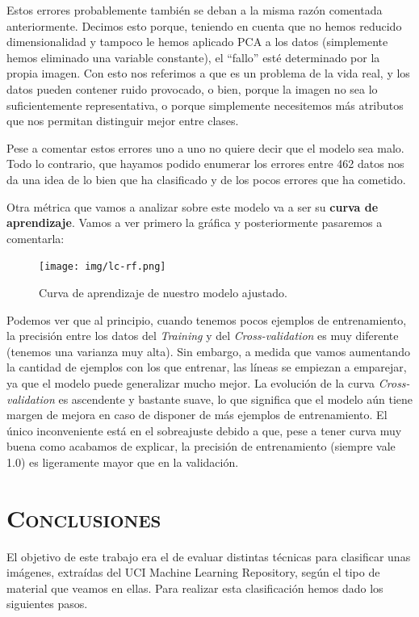 \documentclass[11pt,a4paper]{article}
\begin{document}
Estos errores probablemente también se deban a la misma razón comentada anteriormente. Decimos esto porque, teniendo en cuenta que no
hemos reducido dimensionalidad y tampoco le hemos aplicado PCA a los datos (simplemente hemos eliminado una variable constante), el ``fallo'' 
esté determinado por la propia imagen. Con esto nos referimos a que es un problema de la vida real, y los datos pueden contener ruido
provocado, o bien, porque la imagen no sea lo suficientemente representativa, o porque simplemente necesitemos más atributos que nos
permitan distinguir mejor entre clases.

Pese a comentar estos errores uno a uno no quiere decir que el modelo sea malo. Todo lo contrario, que hayamos podido enumerar los errores
entre 462 datos nos da una idea de lo bien que ha clasificado y de los pocos errores que ha cometido.

Otra métrica que vamos a analizar sobre este modelo va a ser su \textbf{curva de aprendizaje}. Vamos a ver primero la gráfica y
posteriormente pasaremos a comentarla:

\begin{figure}[H]
    \centering
    \texttt{[image: img/lc-rf.png]}
    \caption{Curva de aprendizaje de nuestro modelo ajustado.}
    \label{fig:lc-rf}
\end{figure}

Podemos ver que al principio, cuando tenemos pocos ejemplos de entrenamiento, la precisión entre los datos del \textit{Training} y del
\textit{Cross-validation} es muy diferente (tenemos una varianza muy alta). Sin embargo, a medida que vamos aumentando la cantidad de
ejemplos con los que entrenar, las líneas se empiezan a emparejar, ya que el modelo puede generalizar mucho mejor. La evolución de la curva
\textit{Cross-validation} es ascendente y bastante suave, lo que significa que el modelo aún tiene margen de mejora en caso de disponer de
más ejemplos de entrenamiento. El único inconveniente está en el sobreajuste debido a que, pese a tener curva muy buena como acabamos de
explicar, la precisión de entrenamiento (siempre vale 1.0) es ligeramente mayor que en la validación.

\newpage

\section{\textsc{Conclusiones}}

El objetivo de este trabajo era el de evaluar distintas técnicas para clasificar unas imágenes, extraídas del UCI Machine Learning
Repository, según el tipo de material que veamos en ellas. Para realizar esta clasificación hemos dado los siguientes pasos.
\end{document}
